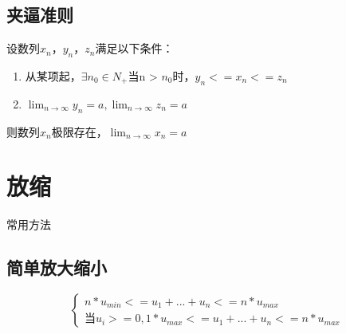 \subsection{夹逼准则}

设数列{\(x_n\)}，{\(y_n\)}，{\(z_n\)}满足以下条件：
\begin{enumerate}
    \item 从某项起，\(\exists n_0 \in N_+\)当n > \(n_0\)时，\(y_n <= x_n <= z_n\)
    \item \(\displaystyle \lim_{n \to \infty}y_n = a, \displaystyle \lim_{n \to \infty}z_n = a\)
\end{enumerate}
则数列{\(x_n\)}极限存在，\(\displaystyle \lim_{n \to \infty}x_n = a\)


\section{放缩}
常用方法

\subsection{简单放大缩小}
\[
\begin{cases}
n * u_{min} <= u_1 + ... + u_n <= n * u_{max} \\ 
\text{当}u_i >= 0, 1 * u_{max} <= u_1 + ... + u_n <= n * u_{max}
\end{cases}
\]

